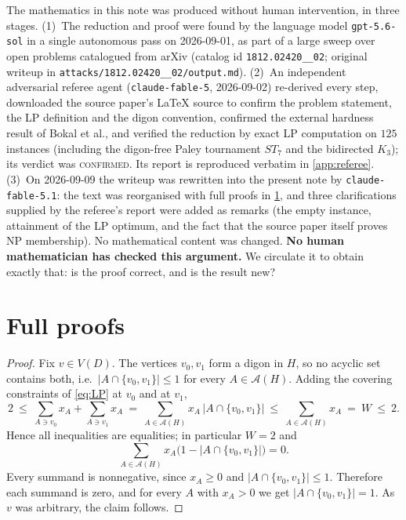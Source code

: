 \documentclass[11pt,a4paper]{article}
\theoremstyle{plain}
\theoremstyle{definition}
\theoremstyle{remark}
\newcommand{\cA}{\mathcal A}
\begin{document}
The mathematics in this note was produced without human intervention, in three stages.
(1)~The reduction and proof were found by the language model \texttt{gpt-5.6-sol} in a single autonomous pass on 2026-09-01, as part of a large sweep over open problems catalogued from arXiv (catalog id \texttt{1812.02420\_\_02}; original writeup in \texttt{attacks/1812.02420\_\_02/output.md}).
(2)~An independent adversarial referee agent (\texttt{claude-fable-5}, 2026-09-02) re-derived every step, downloaded the source paper's \LaTeX{} source to confirm the problem statement, the LP definition and the digon convention, confirmed the external hardness result of Bokal et al., and verified the reduction by exact LP computation on $125$ instances (including the digon-free Paley tournament $ST_7$ and the bidirected $K_3$); its verdict was \textsc{confirmed}. Its report is reproduced verbatim in \cref{app:referee}.
(3)~On 2026-09-09 the writeup was rewritten into the present note by \texttt{claude-fable-5.1}: the text was reorganised with full proofs in \cref{app:proofs}, and three clarifications supplied by the referee's report were added as remarks (the empty instance, attainment of the LP optimum, and the fact that the source paper itself proves NP membership). No mathematical content was changed.
\textbf{No human mathematician has checked this argument.} We circulate it to obtain exactly that: is the proof correct, and is the result new?


\appendix

\section{Full proofs}\label{app:proofs}

\label{pf:forcing}
\lemforcing*
\begin{proof}
Fix $v\in V(D)$. The vertices $v_0,v_1$ form a digon in $H$, so no acyclic set contains both, i.e.\ $|A\cap\{v_0,v_1\}|\le1$ for every $A\in\cA(H)$. Adding the covering constraints of \eqref{eq:LP} at $v_0$ and at $v_1$,
\[
 2\ \le\ \sum_{A\ni v_0}x_A+\sum_{A\ni v_1}x_A\ =\ \sum_{A\in\cA(H)}x_A\,|A\cap\{v_0,v_1\}|\ \le\ \sum_{A\in\cA(H)}x_A\ =\ W\ \le\ 2 .
\]
Hence all inequalities are equalities; in particular $W=2$ and
\[
 \sum_{A\in\cA(H)}x_A\bigl(1-|A\cap\{v_0,v_1\}|\bigr)=0 .
\]
Every summand is nonnegative, since $x_A\ge0$ and $|A\cap\{v_0,v_1\}|\le1$. Therefore each summand is zero, and for every $A$ with $x_A>0$ we get $|A\cap\{v_0,v_1\}|=1$. As $v$ was arbitrary, the claim follows.
\end{proof}
\end{document}
